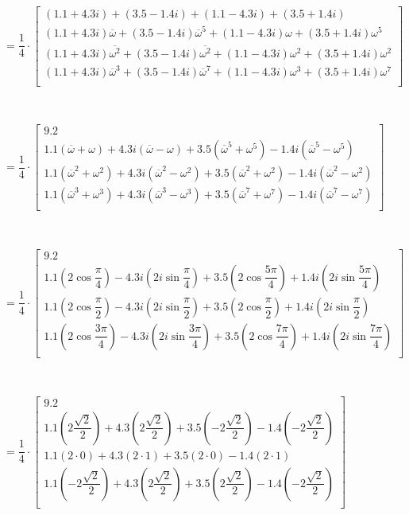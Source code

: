 $ $

$= \dfrac{1}{4} \cdot
\begin{bmatrix}
(1.1 + 4.3i) + (3.5 - 1.4i) + (1.1 - 4.3i) + (3.5 + 1.4i)\\
(1.1 + 4.3i)\overline{\omega} + (3.5 - 1.4i)\overline{\omega}^5 + (1.1 - 4.3i)\omega+ (3.5 + 1.4i)\omega^5 \\
(1.1 + 4.3i)\overline{\omega^2} + (3.5 - 1.4i)\overline{\omega^2} + (1.1 - 4.3i)\omega^2+ (3.5 + 1.4i)\omega^2 \\
(1.1 + 4.3i)\overline{\omega}^3 + (3.5 - 1.4i)\overline{\omega}^7 + (1.1 - 4.3i)\omega^3 + (3.5 + 1.4i)\omega^7 \\
\end{bmatrix}$

$ $

$= \dfrac{1}{4} \cdot
\begin{bmatrix}
9.2\\
1.1(\overline{\omega} + \omega) + 4.3i(\overline{\omega} - \omega) +
3.5(\overline{\omega}^5 + \omega^5) - 1.4i(\overline{\omega}^5 - \omega^5)\\
1.1(\overline{\omega}^2 + {\omega}^2) + 4.3i(\overline{\omega}^2 - {\omega}^2) +
3.5(\overline{\omega}^2 + {\omega}^2) - 1.4i(\overline{\omega}^2 - {\omega}^2)\\
1.1(\overline{\omega}^3 + {\omega}^3) + 4.3i(\overline{\omega}^3 - {\omega}^3) +
3.5(\overline{\omega}^7 + {\omega}^7) - 1.4i(\overline{\omega}^7 - {\omega}^7)\\
\end{bmatrix}$

$ $

$= \dfrac{1}{4} \cdot
\begin{bmatrix}
9.2\\
1.1\left(2\cos\dfrac{\pi}{4}\right) - 4.3i\left(2i\sin\dfrac{\pi}{4}\right) + 3.5\left(2\cos\dfrac{5\pi}{4}\right) + 1.4i\left(2i\sin\dfrac{5\pi}{4}\right)\\
1.1\left(2\cos\dfrac{\pi}{2}\right) - 4.3i\left(2i\sin\dfrac{\pi}{2}\right) + 3.5\left(2\cos\dfrac{\pi}{2}\right) + 1.4i\left(2i\sin\dfrac{\pi}{2}\right)\\
1.1\left(2\cos\dfrac{3\pi}{4}\right) - 4.3i\left(2i\sin\dfrac{3\pi}{4}\right) + 3.5 \left(2\cos\dfrac{7\pi}{4}\right) + 1.4i\left(2i\sin\dfrac{7\pi}{4}\right)\\
\end{bmatrix}$

$ $

$= \dfrac{1}{4} \cdot
\begin{bmatrix}
9.2\\
1.1\left(2\dfrac{\sqrt{2}}{2}\right) + 4.3\left(2\dfrac{\sqrt{2}}{2}\right) + 3.5\left(-2\dfrac{\sqrt{2}}{2}\right) - 1.4\left(-2\dfrac{\sqrt{2}}{2}\right)\\
1.1(2\cdot 0) + 4.3(2\cdot1) + 3.5(2\cdot 0) - 1.4(2\cdot 1)\\
1.1\left(-2\dfrac{\sqrt{2}}{2}\right) + 4.3\left(2\dfrac{\sqrt{2}}{2}\right) + 3.5 \left(2\dfrac{\sqrt{2}}{2}\right) - 1.4\left(-2\dfrac{\sqrt{2}}{2}\right)\\
\end{bmatrix}$

